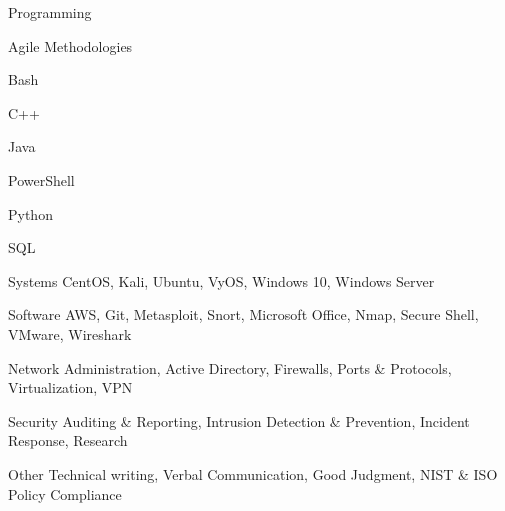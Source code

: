 

\begin{cvskills}
  \cvskill    
    {Programming}
    {
    \begin{itemize*}[noitemsep]
      \item Agile Methodologies \hfil
      \item Bash \hfil
      \item C++ \hfil
      \item Java \hfil
      \item PowerShell \hfil
      \item Python \hfil
      \item SQL \hfil
    \end{itemize*}
    }


  \cvskill
    {Systems} %
    {CentOS, Kali, Ubuntu, VyOS, Windows 10, Windows Server}

  \cvskill
     {Software}
     {AWS, Git, Metasploit, Snort, Microsoft Office, Nmap, Secure Shell, VMware, Wireshark}

  \cvskill
     {Network}
     {Administration, Active Directory, Firewalls, Ports \& Protocols, Virtualization, VPN}

  \cvskill
     {Security}
     {Auditing \& Reporting, Intrusion Detection \& Prevention, Incident Response, Research}

  \cvskill
     {Other}
     {Technical writing, Verbal Communication, Good Judgment, NIST \& ISO Policy Compliance}



\end{cvskills}
